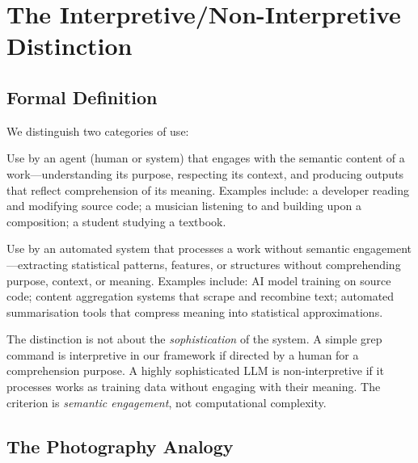 \documentclass[11pt,twocolumn]{article}
\begin{document}
\section{The Interpretive/Non-Interpretive Distinction}
\label{sec:interpretive-distinction}

\subsection{Formal Definition}

We distinguish two categories of use:

\begin{description}[style=nextline]
    \item[\textbf{Interpretive use}]
    Use by an agent (human or system) that engages with the semantic
    content of a work---understanding its purpose, respecting its
    context, and producing outputs that reflect comprehension of its
    meaning. Examples include: a developer reading and modifying source
    code; a musician listening to and building upon a composition; a
    student studying a textbook.

    \item[\textbf{Non-interpretive use}]
    Use by an automated system that processes a work without semantic
    engagement---extracting statistical patterns, features, or structures
    without comprehending purpose, context, or meaning. Examples include:
    AI model training on source code; content aggregation systems that
    scrape and recombine text; automated summarisation tools that compress
    meaning into statistical approximations.
\end{description}

The distinction is not about the \emph{sophistication} of the system. A
simple grep command is interpretive in our framework if directed by a
human for a comprehension purpose. A highly sophisticated LLM is
non-interpretive if it processes works as training data without engaging
with their meaning. The criterion is \emph{semantic engagement}, not
computational complexity.

\subsection{The Photography Analogy}
\end{document}
